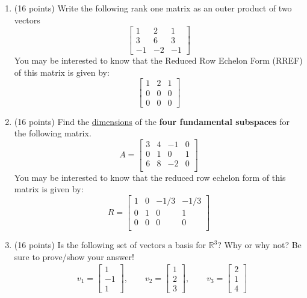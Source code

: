 \documentclass[12pt, a4paper]{article}
\theoremstyle{break}
\begin{document}
\begin{enumerate}
\item (16 points) Write the following rank one matrix as an outer product of two vectors
\begin{equation}
\begin{bmatrix}
1 & 2 & 1 \\
3&6&3 \\
-1&-2&-1
\end{bmatrix} \nonumber
\end{equation}
You may be interested to know that the Reduced Row Echelon Form (RREF) of this matrix is given by:
\begin{equation}
\begin{bmatrix}
1 & 2 & 1 \\
0&0&0 \\
0&0&0
\end{bmatrix} \nonumber
\end{equation}
\newpage

\item (16 points) Find the \underline{dimensions} of the \textbf{four fundamental subspaces} for the following matrix.
\begin{equation}
A=\begin{bmatrix}
3 & 4 &-1&0 \\
0 & 1 & 0 & 1 \\
6 & 8 &-2 &0 \\
\end{bmatrix} \nonumber
\end{equation}
You may be interested to know that the reduced row echelon form of this matrix is given by:
\begin{equation}
R=\begin{bmatrix}
1 & 0 &-1/3&-1/3 \\
0 & 1 & 0 & 1 \\
0& 0 &0 &0 \\
\end{bmatrix} \nonumber
\end{equation}
\newpage

\item (16 points)  Is the following set of vectors a basis for $\mathbb{R}^3$? Why or why not? Be sure to prove/show your answer!
\begin{align}
& v_1=\begin{bmatrix} 1 \\ -1 \\ 1 \end{bmatrix}, \qquad v_2=\begin{bmatrix} 1 \\ 2 \\ 3 \end{bmatrix} , \qquad v_3=\begin{bmatrix} 2 \\ 1\\4 \end{bmatrix} \nonumber
\end{align}





\end{enumerate}
\end{document}
